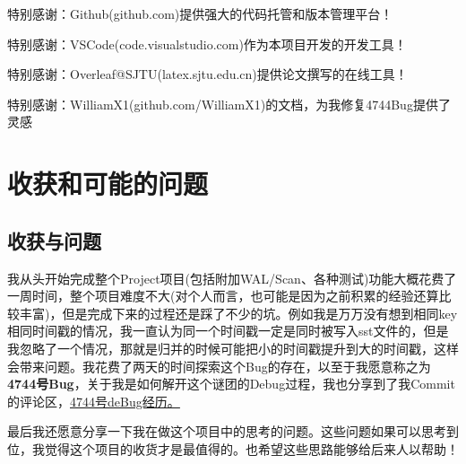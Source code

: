 \documentclass[fontset=windows]{article}
\begin{document}
特别感谢：Github(github.com)提供强大的代码托管和版本管理平台！

特别感谢：VSCode(code.visualstudio.com)作为本项目开发的开发工具！

特别感谢：Overleaf@SJTU(latex.sjtu.edu.cn)提供论文撰写的在线工具！

特别感谢：WilliamX1(github.com/WilliamX1)的文档，为我修复4744Bug提供了灵感

\section{收获和可能的问题}

\subsection{收获与问题}
我从头开始完成整个Project项目(包括附加WAL/Scan、各种测试)功能大概花费了一周时间，整个项目难度不大(对个人而言，也可能是因为之前积累的经验还算比较丰富)，但是完成下来的过程还是踩了不少的坑。例如我是万万没有想到相同key相同时间戳的情况，我一直认为同一个时间戳一定是同时被写入sst文件的，但是我忽略了一个情况，那就是归并的时候可能把小的时间戳提升到大的时间戳，这样会带来问题。我花费了两天的时间探索这个Bug的存在，以至于我愿意称之为\textbf{4744号Bug}，关于我是如何解开这个谜团的Debug过程，我也分享到了我Commit的评论区，\href{https://github.com/Musicminion/2022-2023-2-Advanced-Data-Structure/commit/788e97b823a08bb03a8ae1b3aa83fd1b530323b1#commitcomment-104192045}{\underline{4744号deBug经历。}}

最后我还愿意分享一下我在做这个项目中的思考的问题。这些问题如果可以思考到位，我觉得这个项目的收货才是最值得的。也希望这些思路能够给后来人以帮助！
\end{document}

